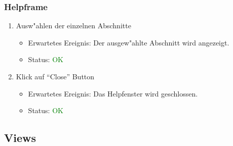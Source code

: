 \subsubsection{Helpframe}
\begin{enumerate}
\item Ausw"ahlen der einzelnen Abschnitte
\begin{itemize}
\item Erwartetes Ereignis: Der ausgew"ahlte Abschnitt wird angezeigt.
\item Status: \textcolor{green}{OK}
\end{itemize}
\item Klick auf "`Close"' Button
\begin{itemize}
\item Erwartetes Ereignis: Das Helpfenster wird geschlossen.
\item Status: \textcolor{green}{OK}
\end{itemize}
\end{enumerate}

\subsection{Views}
